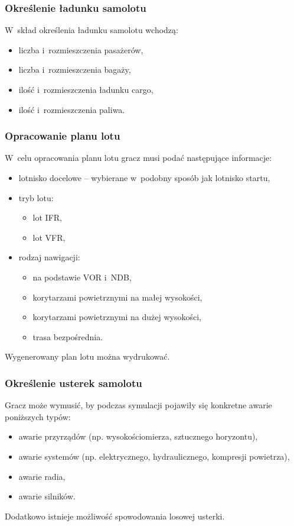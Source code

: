 \documentclass{mwrep}
\begin{document}
\subsubsection{Określenie ładunku samolotu}
W~skład określenia ładunku samolotu wchodzą:
\begin{itemize}
\item liczba i~rozmieszczenia pasażerów,
\item liczba i~rozmieszczenia bagaży,
\item ilość i~rozmieszczenia ładunku cargo,
\item ilość i~rozmieszczenia paliwa.
\end{itemize}

\subsubsection{Opracowanie planu lotu}
W~celu opracowania planu lotu gracz musi podać następujące informacje:
\begin{itemize}
\item lotnisko docelowe -- wybierane w~podobny sposób jak lotnisko startu,
\item tryb lotu:
\begin{itemize}
\item lot IFR,
\item lot VFR,
\end{itemize}
\item rodzaj nawigacji:
\begin{itemize}
\item na podstawie VOR i~NDB,
\item korytarzami powietrznymi na małej wysokości,
\item korytarzami powietrznymi na dużej wysokości,
\item trasa bezpośrednia.
\end{itemize}
\end{itemize}
Wygenerowany plan lotu można wydrukować.

\subsubsection{Określenie usterek samolotu}
Gracz może wymusić, by podczas symulacji pojawiły się konkretne awarie poniższych typów:
\begin{itemize}
\item awarie przyrządów (np. wysokościomierza, sztucznego horyzontu),
\item awarie systemów (np. elektrycznego, hydraulicznego, kompresji powietrza),
\item awarie radia,
\item awarie silników.
\end{itemize}
Dodatkowo istnieje możliwość spowodowania losowej usterki.
\end{document}
